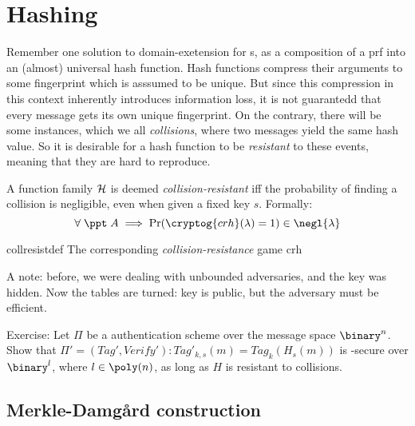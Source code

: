 \section{Hashing}

Remember one solution to domain-exetension for \prf{}s, as a composition of a prf into an (almost) universal hash function. Hash functions compress their arguments to some fingerprint which is asssumed to be unique. But since this compression in this context inherently introduces information loss, it is not guarantedd that every message gets its own unique fingerprint. On the contrary, there will be some instances, which we all \emph{collisions}, where two messages yield the same hash value. So it is desirable for a hash function to be \emph{resistant} to these events, meaning that they are hard to reproduce.

\begin{definition}
    A function family $\mathcal{H}$ is deemed \emph{collision-resistant} iff the probability of finding a collision is negligible, even when given a fixed key $s$. Formally:
    \[
        \forall\; \ppt\; A \implies \Pr(\cryptog{crh}(\lambda) = 1) \in \negl{\lambda} 
    \]

    \begin{cryptogame}
        {collresistdef}
        {The corresponding \emph{collision-resistance} game}
        {crh}


        
    \end{cryptogame}
\end{definition}

A note: before, we were dealing with unbounded adversaries, and the key was hidden. Now the tables are turned: key is public, but the adversary must be efficient.

Exercise: Let $\Pi$ be a \ufcma authentication scheme over the message space $\binary^n$. Show that $\Pi' = (Tag', Verify') : Tag'_{k, s}(m) = Tag_k(H_s(m))$ is \ufcma-secure over $\binary^l$, where $l \in \poly(n)$, as long as $H$ is resistant to collisions.

\subsection{Merkle-Damg\r{a}rd construction}

